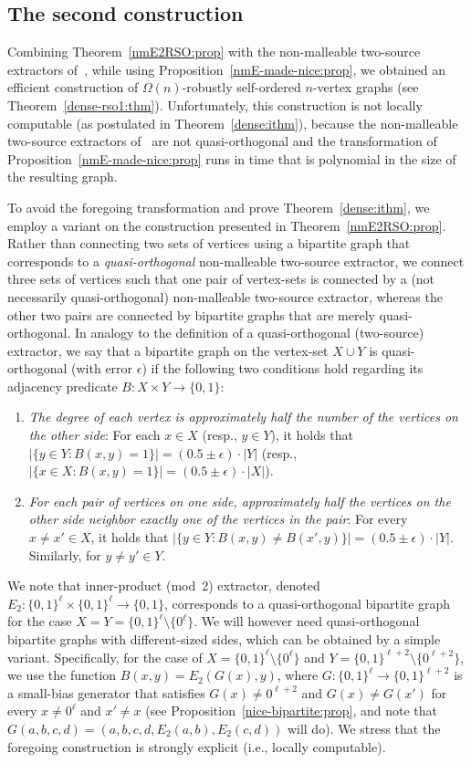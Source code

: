 \documentclass[10pt,a4paper]{article}
\theoremstyle{definition}
\newcommand{\e}{\epsilon}
\newcommand{\bitset}{\{0,1\}}
\newcommand{\BE}{\begin{enumerate}}
\newcommand{\EE}{\end{enumerate}}
\begin{document}
%
%
%
%

\subsection{The second construction}
\label{dense:rso2:sec}
Combining Theorem~\ref{nmE2RSO:prop}
with the non-malleable two-source extractors of~\cite[Thm.~1]{CGL},
while using Proposition~\ref{nmE-made-nice:prop},
we obtained an efficient construction
of $\Omega(n)$-robustly self-ordered $n$-vertex graphs
(see Theorem~\ref{dense-rso1:thm}).
%
%
%
Unfortunately, this construction is not locally computable
(as postulated in Theorem~\ref{dense:ithm}),
because the non-malleable two-source extractors of~\cite[Thm.~1]{CGL}
are not quasi-orthogonal and the transformation
of Proposition~\ref{nmE-made-nice:prop} runs in time
that is polynomial in the size of the resulting graph.

To avoid the foregoing transformation and prove Theorem~\ref{dense:ithm},
we employ a variant on the construction presented
in Theorem~\ref{nmE2RSO:prop}.
Rather than connecting two sets of vertices using
a bipartite graph that corresponds to
a {\em quasi-orthogonal}\/ non-malleable two-source extractor,
we connect three sets of vertices such that one pair
of vertex-sets is connected by a (not necessarily quasi-orthogonal)
non-malleable two-source extractor, whereas the other two pairs
are connected by bipartite graphs that are merely quasi-orthogonal.
In analogy to the definition of a quasi-orthogonal (two-source) extractor,
we say that a bipartite graph on the vertex-set $X\cup Y$
is {\sf quasi-orthogonal} (with error $\e$)
if the following two conditions hold regarding
its adjacency predicate $B:X\times Y\to\bitset$:
\BE
\item
{\em The degree of each vertex is approximately half
the number of the vertices on the other side}:
For each $x\in X$ (resp., $y\in Y$), it holds that
$|\{y\!\in\!Y\!:\!B(x,y)\!=\!1\}|=(0.5\pm\e)\cdot|Y|$
(resp., $|\{x\!\in\!X\!:\!B(x,y)\!=\!1\}|=(0.5\pm\e)\cdot|X|$).
%
%
\item
%
%
{\em For each pair of vertices on one side,
approximately half the vertices on the other side
neighbor exactly one of the vertices in the pair}:
For every $x\neq x'\in X$, it holds that
$|\{y\!\in\!Y\!:\!B(x,y)\!\neq\!B(x',y)\}|=(0.5\pm\e)\cdot|Y|$.
%
%
Similarly, for $y\neq y'\in Y$.
\EE
We note that inner-product (mod~2) extractor,
denoted $E_2:\bitset^\ell\times\bitset^\ell\to\bitset$,
corresponds to a quasi-orthogonal bipartite graph for
the case $X=Y=\bitset^\ell\setminus\{0^\ell\}$.
We will however need quasi-orthogonal bipartite graphs with
different-sized sides, which can be obtained by a simple variant.
Specifically, for the case of $X=\bitset^\ell\setminus\{0^\ell\}$
and $Y=\bitset^{\ell+2}\setminus\{0^{\ell+2}\}$,
we use the function $B(x,y)=E_2(G(x),y)$,
where $G:\bitset^\ell\to\bitset^{\ell+2}$
is a small-bias generator that satisfies $G(x)\neq0^{\ell+2}$
and $G(x)\neq G(x')$ for every $x\neq0^\ell$ and $x'\neq x$
(see Proposition~\ref{nice-bipartite:prop},
and note that $G(a,b,c,d)=(a,b,c,d,E_2(a,b),E_2(c,d))$ will do).
We stress that the foregoing construction is strongly explicit
(i.e., locally computable).
%
%
%
\end{document}
